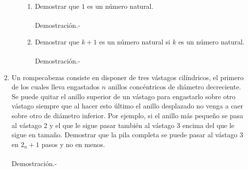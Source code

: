 \begin{enumerate}
\begin{enumerate}[\bfseries (a)]
                \begin{enumerate}[\bfseries (i)]
                   \item Demostrar que $1$ es un número natural.\\\\
                      Demostración.-\;
                   \item Demostrar que $k+1$ es un  número natural si $k$ es un número natural.\\\\
                      Demostración.-\;
                \end{enumerate}
          \end{enumerate}

       \item Un rompecabezas consiste en disponer de tres vástagos cilíndricos, el primero de los cuales lleva engastados $n$ anillos concéntricos de diámetro decreciente. Se puede quitar el anillo superior de un vástago para engastarlo sobre otro vástago siempre que al hacer esto último el anillo desplazado no venga a caer sobre otro de diámetro inferior. Por ejemplo, si el anillo más pequeño se pasa al vástago 2 y el que le sigue pasar también al vástago 3 encima del que le sigue en tamaño. Demostrar que la pila completa se puede pasar al vástago 3 en $2_n+1$ pasos  y no en menos.\\\\
          Demostración.-\;


\end{enumerate}
